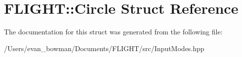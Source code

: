 \hypertarget{struct_f_l_i_g_h_t_1_1_circle}{}\section{F\+L\+I\+G\+HT\+:\+:Circle Struct Reference}
\label{struct_f_l_i_g_h_t_1_1_circle}


The documentation for this struct was generated from the following file\+:\begin{DoxyCompactItemize}
\item 
/\+Users/evan\+\_\+bowman/\+Documents/\+F\+L\+I\+G\+H\+T/src/Input\+Modes.\+hpp\end{DoxyCompactItemize}

